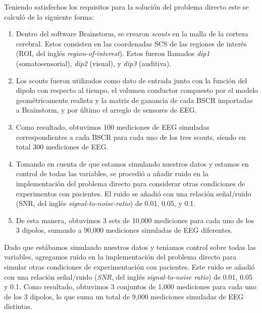 Teniendo satisfechos los requisitos para la solución del problema directo este se calculó de la siguiente forma:

\begin{enumerate}
	\item Dentro del software Brainstorm, se crearon \emph{scouts} en la malla de la corteza cerebral. Estos consisten en las coordenadas SCS de las regiones de interés (ROI, del inglés \emph{region-of-interest}). Estos fueron llamados \emph{dip1} (somatosensorial), \emph{dip2} (visual), y \emph{dip3} (auditiva).
	\item Los scouts fueron utilizados como dato de entrada junto con la función del dipolo con respecto al tiempo, el volumen conductor compuesto por el modelo geométricamente realista y la matriz de ganancia de cada BSCR importadas a Brainstorm, y por último el arreglo de sensores de EEG.
	\item Como resultado, obtuvimos 100 mediciones de EEG simuladas correspondientes a cada BSCR para cada uno de los tres scouts, siendo en total 300 mediciones de EEG.
	\item Tomando en cuenta de que estamos simulando nuestros datos y estamos en control de todas las variables, se procedió a añadir ruido en la implementación del problema directo para considerar otras condiciones de experimentos con pacientes. El ruido se añadió con una relación señal/ruido (SNR, del inglés \emph{signal-to-noise-ratio}) de 0.01, 0.05, y 0.1.
	\item De esta manera, obtuvimos 3 sets de 10,000 mediciones para cada uno de los 3 dipolos, sumando a 90,000 mediciones simuladas de EEG diferentes.
\end{enumerate}

Dado que estábamos simulando nuestros datos y teníamos control sobre todas las variables, agregamos ruido en la implementación del problema directo para simular otras condiciones de experimentación con pacientes. Este ruido se añadió con una relación señal/ruido (\emph{SNR}, del inglés \emph{signal-to-noise ratio}) de 0.01, 0.05 y 0.1. Como resultado, obtuvimos 3 conjuntos de 1,000 mediciones para cada uno de los 3 dipolos, lo que suma un total de 9,000 mediciones simuladas de EEG distintas.

